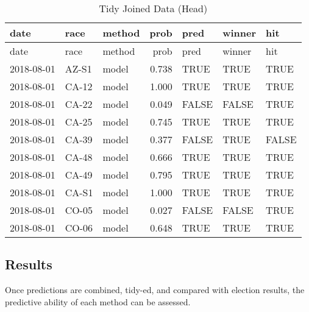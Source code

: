 \documentclass[]{article}
\newenvironment{Shaded}{\begin{snugshade}}{\end{snugshade}}
\newcommand{\CommentTok}[1]{\textcolor[rgb]{0.56,0.35,0.01}{\textit{#1}}}
\newcommand{\DataTypeTok}[1]{\textcolor[rgb]{0.13,0.29,0.53}{#1}}
\newcommand{\FloatTok}[1]{\textcolor[rgb]{0.00,0.00,0.81}{#1}}
\newcommand{\KeywordTok}[1]{\textcolor[rgb]{0.13,0.29,0.53}{\textbf{#1}}}
\newcommand{\NormalTok}[1]{#1}
\newcommand{\OperatorTok}[1]{\textcolor[rgb]{0.81,0.36,0.00}{\textbf{#1}}}
\newcommand{\StringTok}[1]{\textcolor[rgb]{0.31,0.60,0.02}{#1}}
\begin{document}
\begin{Shaded}
\end{Shaded}

\begin{longtable}[]{@{}lllrlll@{}}
\caption{Tidy Joined Data (Head)}\tabularnewline
\toprule
date & race & method & prob & pred & winner & hit\tabularnewline
\midrule
\endfirsthead
\toprule
date & race & method & prob & pred & winner & hit\tabularnewline
\midrule
\endhead
2018-08-01 & AZ-S1 & model & 0.738 & TRUE & TRUE & TRUE\tabularnewline
2018-08-01 & CA-12 & model & 1.000 & TRUE & TRUE & TRUE\tabularnewline
2018-08-01 & CA-22 & model & 0.049 & FALSE & FALSE & TRUE\tabularnewline
2018-08-01 & CA-25 & model & 0.745 & TRUE & TRUE & TRUE\tabularnewline
2018-08-01 & CA-39 & model & 0.377 & FALSE & TRUE & FALSE\tabularnewline
2018-08-01 & CA-48 & model & 0.666 & TRUE & TRUE & TRUE\tabularnewline
2018-08-01 & CA-49 & model & 0.795 & TRUE & TRUE & TRUE\tabularnewline
2018-08-01 & CA-S1 & model & 1.000 & TRUE & TRUE & TRUE\tabularnewline
2018-08-01 & CO-05 & model & 0.027 & FALSE & FALSE & TRUE\tabularnewline
2018-08-01 & CO-06 & model & 0.648 & TRUE & TRUE & TRUE\tabularnewline
\bottomrule
\end{longtable}

\hypertarget{results}{%
\subsection{Results}\label{results}}

Once predictions are combined, tidy-ed, and compared with election
results, the predictive ability of each method can be assessed.
\end{document}
